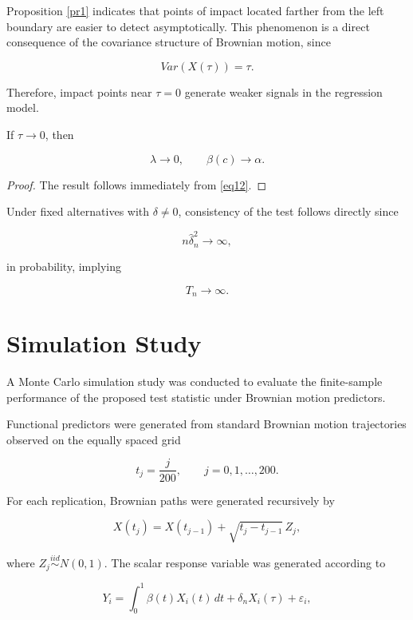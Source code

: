 \documentclass[twoside]{article}
\begin{document}

Proposition \ref{pr1} indicates that points of impact located farther from the left boundary are easier to detect asymptotically. This phenomenon is a direct consequence of the covariance structure of Brownian motion, since

\[
Var(X(\tau))=\tau.
\]

Therefore, impact points near $\tau=0$ generate weaker signals in the regression model.


\begin{cor}\label{cor1}
	If $\tau\to0$, then
	
	\[
	\lambda\to0,
	\qquad
	\beta(c)\to\alpha.
	\]
\end{cor}

\begin{proof}
	The result follows immediately from \eqref{eq12}.
\end{proof}


Under fixed alternatives with $\delta\neq0$, consistency of the test follows directly since

\[
n\widehat{\delta}_n^2\to\infty,
\]

in probability, implying

\[
T_n\to\infty.
\]


\section{Simulation Study}\label{sec4}

A Monte Carlo simulation study was conducted to evaluate the finite-sample performance of the proposed test statistic under Brownian motion predictors.

Functional predictors were generated from standard Brownian motion trajectories observed on the equally spaced grid

\[
t_j=\frac{j}{200},
\qquad
j=0,1,\ldots,200.
\]

For each replication, Brownian paths were generated recursively by

\[
X(t_j)=X(t_{j-1})+\sqrt{t_j-t_{j-1}}\,Z_j,
\]

where $Z_j\stackrel{iid}{\sim}N(0,1)$. The scalar response variable was generated according to

\begin{equation}\label{eq14}
	Y_i=
	\int_0^1\beta(t)X_i(t)\,dt
	+
	\delta_nX_i(\tau)
	+
	\varepsilon_i,
\end{equation}
\end{document}
